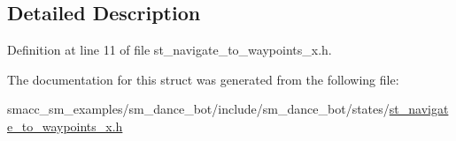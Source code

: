 \subsection{Detailed Description}


Definition at line 11 of file st\+\_\+navigate\+\_\+to\+\_\+waypoints\+\_\+x.\+h.



The documentation for this struct was generated from the following file\+:\begin{DoxyCompactItemize}
\item 
smacc\+\_\+sm\+\_\+examples/sm\+\_\+dance\+\_\+bot/include/sm\+\_\+dance\+\_\+bot/states/\hyperlink{st__navigate__to__waypoints__x_8h}{st\+\_\+navigate\+\_\+to\+\_\+waypoints\+\_\+x.\+h}\end{DoxyCompactItemize}
